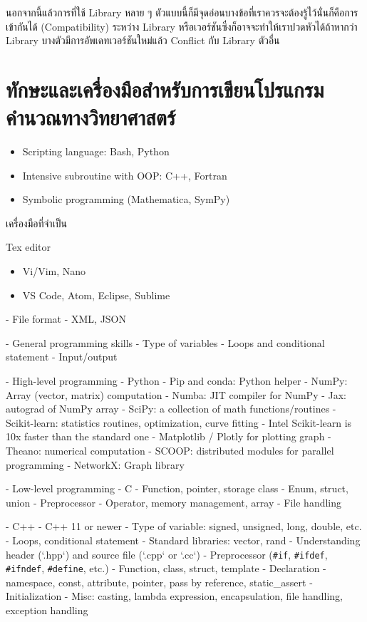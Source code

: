 นอกจากนี้แล้วการที่ใช้ Library หลาย ๆ ตัวแบบนี้ก็มีจุดอ่อนบางข้อที่เราควรจะต้องรู้ไว้นั่นก็คือการเข้ากันได้ (Compatibility) ระหว่าง Library 
หรือเวอร์ชันซึ่งก็อาจจะทำให้เราปวดหัวได้ถ้าหากว่า Library บางตัวมีการอัพเดทเวอร์ชันใหม่แล้ว Conflict กับ Library ตัวอื่น

\section{ทักษะและเครื่องมือสำหรับการเขียนโปรแกรมคำนวณทางวิทยาศาสตร์}

\begin{itemize}
    \item Scripting language: Bash, Python
    
    \item Intensive subroutine with OOP: C++, Fortran
    
    \item Symbolic programming (Mathematica, SymPy)
\end{itemize}

เครื่องมือที่จำเป็น

Tex editor
\begin{itemize}
    \item Vi/Vim, Nano
    
    \item VS Code, Atom, Eclipse, Sublime
\end{itemize}

- File format
  - XML, JSON
  
- General programming skills
  - Type of variables
  - Loops and conditional statement
  - Input/output

- High-level programming
  - Python
    - Pip and conda: Python helper
    - NumPy: Array (vector, matrix) computation
    - Numba: JIT compiler for NumPy
    - Jax: autograd of NumPy array
    - SciPy: a collection of math functions/routines
    - Scikit-learn: statistics routines, optimization, curve fitting
      - Intel Scikit-learn is 10x faster than the standard one
    - Matplotlib / Plotly for plotting graph
    - Theano: numerical computation
    - SCOOP: distributed modules for parallel programming
    - NetworkX: Graph library

- Low-level programming
  - C
    - Function, pointer, storage class
    - Enum, struct, union
    - Preprocessor
    - Operator, memory management, array
    - File handling

  - C++
    - C++ 11 or newer
    - Type of variable: signed, unsigned, long, double, etc.
    - Loops, conditional statement
    - Standard libraries: vector, rand
    - Understanding header (`.hpp`) and source file (`.cpp` or `.cc`)
    - Preprocessor (\texttt{\#if}, \texttt{\#ifdef}, \texttt{\#ifndef}, \texttt{\#define}, etc.)
    - Function, class, struct, template
    - Declaration
      - namespace, const, attribute, pointer, pass by reference, static_assert
    - Initialization
    - Misc: casting, lambda expression, encapsulation, file handling, exception handling

